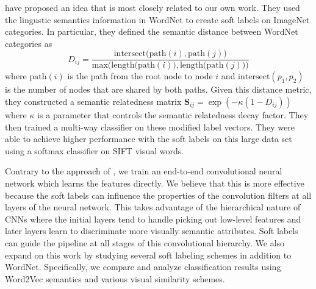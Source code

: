 \cite{zhao2011large} have proposed an idea that is most closely related to our
own work.
They used the lingustic semantics information in WordNet to create soft labels
on ImageNet categories. In particular, they defined the semantic distance
between WordNet categories as
\begin{equation}
D_{ij} = \frac{\mathrm{intersect(path}(i), \mathrm{path}(j))}{\mathrm{max(length(path}(i)), \mathrm{length(path}(j)))}
\end{equation}
where $\mathrm{path}(i)$ is the path from the root node to node $i$ and
$\mathrm{intersect}(p_1, p_2)$ is the number of nodes that are shared by both
paths. Given this distance metric, they constructed a semantic relatedness
matrix $\mathbf{S}_{ij} = \exp(-\kappa(1-D_{ij}))$ where $\kappa$ is a
parameter that controls the semantic relatedness decay factor.
They then trained a multi-way classifier on these modified label vectors. They
were able to achieve higher performance with the soft labels on this large data
set using a softmax classifier on SIFT visual words.


Contrary to the approach of \cite{zhao2011large}, we train an end-to-end
convolutional neural network which learns the features directly.
We believe that this is more effective because the soft labels can influence
the properties of the convolution filters at all layers of the neural network.
This takes advantage of the hierarchical nature of CNNs where the initial
layers tend to handle picking out low-level features and later layers learn to
discriminate more visually semantic attributes. Soft labels can guide the
pipeline at all stages of this convolutional hierarchy.
We also expand on this work by studying several soft labeling schemes in
addition to WordNet. Specifically, we compare and analyze classification
results using Word2Vec semantics and various visual similarity schemes.

